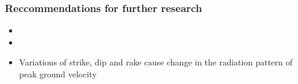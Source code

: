\documentclass[../Text/00main.tex]{subfiles}
\begin{document}
\subsubsection{Reccommendations for further research}

\begin{itemize}
    \item 
    \item 
    \item Variations of strike, dip and rake cause change in the radiation pattern of peak ground velocity 
    
\end{itemize}
\end{document}
